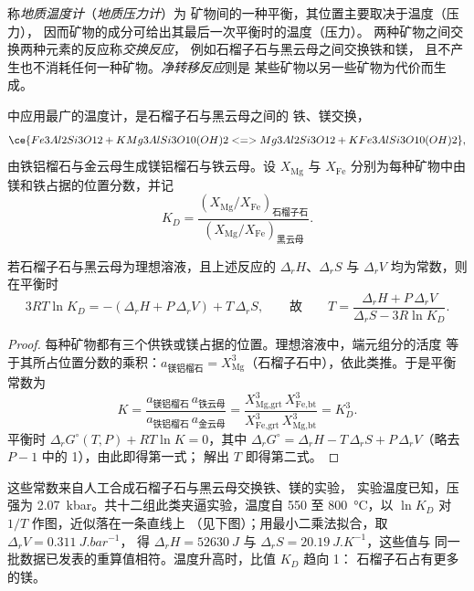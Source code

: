 \begin{definition}\label{def:b2:pt-paths:thermobarometry}
称\emph{地质温度计}（\emph{地质压力计}）为
矿物间的一种平衡，其位置主要取决于温度（压力），
因而矿物的成分可给出其最后一次平衡时的温度（压力）。
两种矿物之间交换两种元素的反应称\emph{交换反应}，
例如石榴子石与黑云母之间交换铁和镁，
且不产生也不消耗任何一种矿物。\emph{净转移反应}则是
某些矿物以另一些矿物为代价而生成。
\end{definition}

中应用最广的温度计，是石榴子石与黑云母之间的
铁、镁交换，
\[
\ce{Fe3Al2Si3O12 + KMg3AlSi3O10(OH)2 <=> Mg3Al2Si3O12 + KFe3AlSi3O10(OH)2},
\]
由铁铝榴石与金云母生成镁铝榴石与铁云母。设 $X_{\text{Mg}}$ 与 $X_{\text{Fe}}$
分别为每种矿物中由镁和铁占据的位置分数，并记
\[
K_D = \frac{(X_{\text{Mg}}/X_{\text{Fe}})_{\text{石榴子石}}}{(X_{\text{Mg}}/X_{\text{Fe}})_{\text{黑云母}}}.
\]

\begin{proposition}[一个交换平衡]\label{prop:b2:pt-paths:exchange}
若石榴子石与黑云母为理想溶液，且上述反应的 $\Delta_r H$、$\Delta_r S$ 与 $\Delta_r V$
均为常数，则在平衡时
\[
3RT\ln K_D = -(\Delta_r H + P\,\Delta_r V) + T\,\Delta_r S,
\qquad\text{故}\qquad
T = \frac{\Delta_r H + P\,\Delta_r V}{\Delta_r S - 3R\ln K_D}.
\]
\end{proposition}

\begin{proof}
每种矿物都有三个供铁或镁占据的位置。理想溶液中，端元组分的活度
等于其所占位置分数的乘积：$a_{\text{镁铝榴石}} =
X_{\text{Mg}}^3$（石榴子石中），依此类推。于是平衡常数为
\[
K = \frac{a_{\text{镁铝榴石}}\,a_{\text{铁云母}}}{a_{\text{铁铝榴石}}\,a_{\text{金云母}}}
= \frac{X_{\text{Mg,grt}}^3\,X_{\text{Fe,bt}}^3}{X_{\text{Fe,grt}}^3\,X_{\text{Mg,bt}}^3} = K_D^3 .
\]
平衡时 $\Delta_r G^\circ(T, P) + RT\ln K = 0$，其中 $\Delta_r G^\circ = \Delta_r H -
T\,\Delta_r S + P\,\Delta_r V$（略去 $P - 1$ 中的 1），由此即得第一式；
解出 $T$ 即得第二式。
\end{proof}

这些常数来自人工合成石榴子石与黑云母交换铁、镁的实验，
实验温度已知，压强为 \qty{2.07}{kbar}。共十二组此类夹逼实验，温度自 550 至
\qty{800}{\celsius}，以 $\ln K_D$ 对 $1/T$ 作图，近似落在一条直线上
（见下图）；用最小二乘法拟合，取 $\Delta_r V = \qty{0.311}{J.bar^{-1}}$，
得 $\Delta_r H = \qty{52630}{J}$ 与 $\Delta_r S = \qty{20.19}{J.K^{-1}}$，这些值与
同一批数据已发表的重算值相符。温度升高时，比值 $K_D$ 趋向 1：
石榴子石占有更多的镁。

